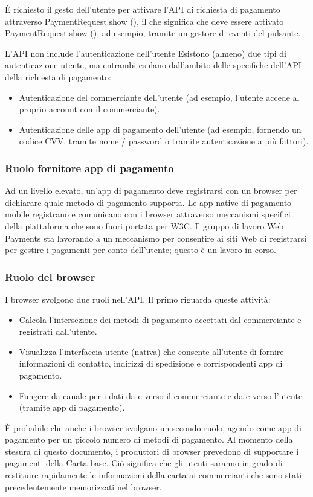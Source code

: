 \documentclass[italian]{article}
\begin{document}
	È richiesto il gesto dell'utente per attivare l'API di richiesta di pagamento attraverso PaymentRequest.show (), il che significa che deve essere attivato PaymentRequest.show (), ad esempio, tramite un gestore di eventi del pulsante.
	
	L'API non include l'autenticazione dell'utente
	Esistono (almeno) due tipi di autenticazione utente, ma	entrambi esulano dall'ambito delle specifiche dell'API della richiesta di pagamento:
	\begin{itemize}
	\item Autenticazione del commerciante dell'utente (ad esempio, l'utente accede al proprio account con il commerciante).
	\item Autenticazione delle app di pagamento dell'utente (ad esempio, fornendo un codice CVV, tramite nome / password o tramite autenticazione a più fattori).
	\end{itemize}
	
	
	
	
	
	 
	\subsubsection{Ruolo fornitore app di pagamento}
	Ad un livello elevato, un'app di pagamento deve registrarsi con un browser per dichiarare quale metodo di pagamento supporta.
	Le app native di pagamento mobile registrano e comunicano con i browser attraverso meccanismi specifici della piattaforma che sono fuori portata per W3C.
	Il gruppo di lavoro Web Payments sta lavorando a un meccanismo per consentire ai siti Web di registrarsi per gestire i pagamenti per conto dell'utente; questo è un lavoro in corso.
	\subsubsection{Ruolo del browser}
	I browser svolgono due ruoli nell'API. Il primo riguarda queste attività:
	\begin{itemize}
	\item Calcola l'intersezione dei metodi di pagamento accettati dal commerciante e registrati dall'utente.
	\item Visualizza l'interfaccia utente (nativa) che consente all'utente di fornire informazioni di contatto, indirizzi di spedizione e corrispondenti app di pagamento.
	\item Fungere da canale per i dati da e verso il commerciante e da e verso l'utente (tramite app di pagamento).
	\end{itemize}
	\begin{flushleft}
	È probabile che anche i browser svolgano un secondo ruolo, agendo come app di pagamento per un piccolo numero di metodi di pagamento. Al momento della stesura di questo documento, i produttori di browser prevedono di supportare i pagamenti della Carta base. Ciò significa che gli utenti saranno in grado di restituire rapidamente le informazioni della carta ai commercianti che sono stati precedentemente memorizzati nel browser.
	\end{flushleft}
	
\end{document}
